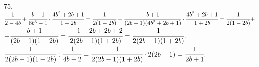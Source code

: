 75. $\cfrac{1}{2-4b}+\cfrac{b+1}{8b^3-1}\cdot\cfrac{4b^2+2b+1}{1+2b}=\cfrac{1}{2(1-2b)}+\cfrac{b+1}{(2b-1)(4b^2+2b+1)}\cdot\cfrac{4b^2+2b+1}{1+2b}=
\cfrac{1}{2(1-2b)}+$\\$+\cfrac{b+1}{(2b-1)(1+2b)}=\cfrac{-1-2b+2b+2}{2(2b-1)(1+2b)}=\cfrac{1}{2(2b-1)(1+2b)}.$\\
$\cfrac{1}{2(2b-1)(1+2b)}:\cfrac{1}{4b-2}=\cfrac{1}{2(2b-1)(1+2b)}\cdot2(2b-1)=\cfrac{1}{2b+1}.$\\
